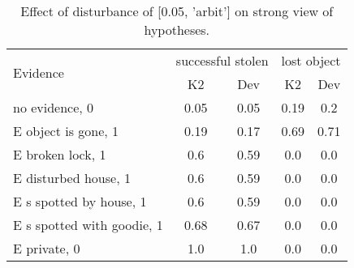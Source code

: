 \begin{table}\begin{tabular}{l|cc|cc}\toprule\multirow{2}{*}{Evidence} & \multicolumn{2}{c}{successful stolen}& \multicolumn{2}{c}{lost object}\\& {K2} & {Dev}& {K2} & {Dev}\\\midrule
no evidence, 0 & 0.05&0.05&0.19&0.2\\E object is gone, 1 & 0.19&0.17&0.69&0.71\\E broken lock, 1 & 0.6&0.59&0.0&0.0\\E disturbed house, 1 & 0.6&0.59&0.0&0.0\\E s spotted by house, 1 & 0.6&0.59&0.0&0.0\\E s spotted with goodie, 1 & 0.68&0.67&0.0&0.0\\E private, 0 & 1.0&1.0&0.0&0.0\\\bottomrule\end{tabular}\caption{Effect of disturbance of [0.05, 'arbit'] on strong view of hypotheses.}\end{table}